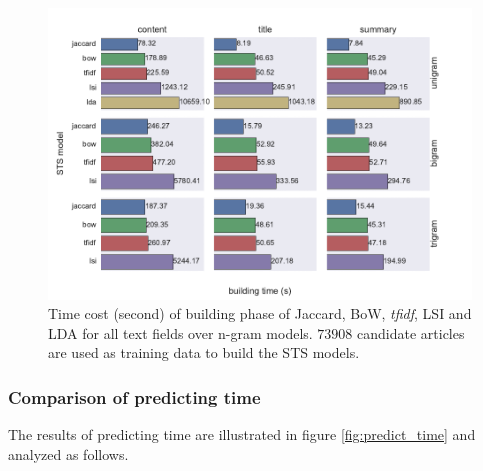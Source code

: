 \begin{figure}[!htb]
    \centering
    \includegraphics[width=\textwidth]{fig/building_time}
    \caption[Time cost (second) of building phase of Jaccard, BoW, \textit{tfidf}, LSI and LDA for all text fields over n-gram models]{Time cost (second) of building phase of Jaccard, BoW, \textit{tfidf}, LSI and LDA for all text fields over n-gram models. $73908$ candidate articles are used as training data to build the STS models.}
    \label{fig:build_time}
\end{figure}
\subsubsection{Comparison of predicting time}

The results of predicting time are illustrated in figure \ref{fig:predict_time} and analyzed as follows. 


